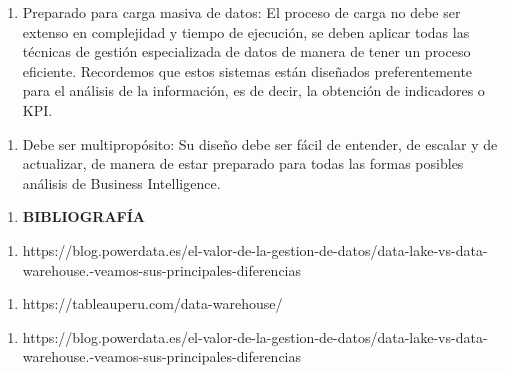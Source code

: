 \documentclass{article} %
\begin{document}
\noindent 

\begin{enumerate}
\item  Preparado para carga masiva de datos: El proceso de carga no debe ser extenso en complejidad y tiempo de ejecuci\'{o}n, se deben aplicar todas las t\'{e}cnicas de gesti\'{o}n especializada de datos de manera de tener un proceso eficiente. Recordemos que estos sistemas est\'{a}n dise\~{n}ados preferentemente para el an\'{a}lisis de la informaci\'{o}n, es de decir, la obtenci\'{o}n de indicadores o KPI.
\end{enumerate}

\noindent 

\begin{enumerate}
\item  Debe ser multiprop\'{o}sito: Su dise\~{n}o debe ser f\'{a}cil de entender, de escalar y de actualizar, de manera de estar preparado para todas las formas posibles an\'{a}lisis de Business Intelligence.
\end{enumerate}

\noindent \textbf{}

\noindent \textbf{}

\noindent \textbf{}

\noindent \textbf{}

\noindent \textbf{}

\noindent \textbf{}

\noindent \textbf{}

\noindent \textbf{}

\begin{enumerate}
\item \textbf{ BIBLIOGRAF\'{I}A}
\end{enumerate}

\noindent \textbf{}

\begin{enumerate}
\item \textbf{ }https://blog.powerdata.es/el-valor-de-la-gestion-de-datos/data-lake-vs-data-warehouse.-veamos-sus-principales-diferencias
\end{enumerate}

\noindent 

\begin{enumerate}
\item  https://tableauperu.com/data-warehouse/
\end{enumerate}

\noindent 

\begin{enumerate}
\item  https://blog.powerdata.es/el-valor-de-la-gestion-de-datos/data-lake-vs-data-warehouse.-veamos-sus-principales-diferencias
\end{enumerate}
\end{document}
